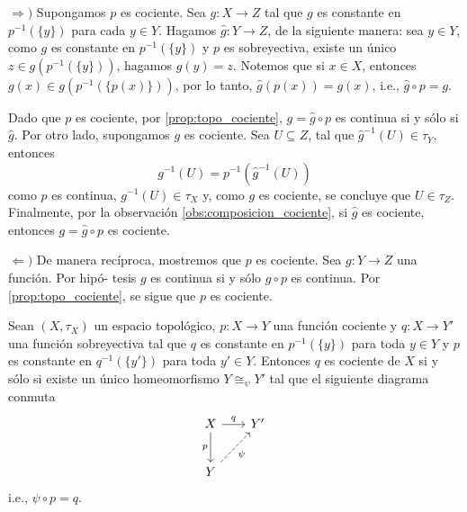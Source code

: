 \begin{dem}
    $\Rightarrow)$ Supongamos $p$ es cociente. Sea $g:X\to Z$ tal que $g$ es constante en $p^{-1}(\{y\})$ para cada $y\in Y$. Hagamos $\hat{g}:Y\to Z$, de la siguiente manera: sea $y\in Y$, como $g$ es constante en $p^{-1}(\{y\})$ y $p$ es sobreyectiva, existe un único $z\in g(p^{-1}(\{y\}))$, hagamos $\hat{g}(y)=z$. Notemos que si $x\in X$, entonces $g(x)\in g(p^{-1}(\{p(x)\}))$, por lo tanto, $\hat{g}(p(x))=g(x)$, i.e., $\hat{g}\circ p=g$. 

    Dado que $p$ es cociente, por \ref{prop:topo_cociente}, $g=\hat{g}\circ p$ es continua si y sólo si $\hat{g}$. Por otro lado, supongamos $g$ es cociente. Sea $U\subseteq Z$, tal que $\hat{g}^{-1}(U)\in\tau_Y$, entonces
    \begin{equation*}
       g^{-1}(U)=p^{-1}(\hat{g}^{-1}(U))
    \end{equation*}
    como $p$ es continua, $g^{-1}(U)\in\tau_X$ y, como $g$ es cociente, se concluye que $U\in\tau_Z$. Finalmente, por la observación \ref{obs:composicion_cociente}, si $\hat{g}$ es cociente, entonces $g=\hat{g}\circ p$ es cociente.

    $\Leftarrow)$ De manera recíproca, mostremos que $p$ es cociente. Sea $g:Y\to Z$ una función. Por hipó- tesis $g$ es continua si y sólo $g\circ p$ es continua. Por \ref{prop:topo_cociente}, se sigue que $p$ es cociente.
\end{dem}
\begin{prop}
\label{prop:homomorphis between quotient}
    Sean $(X,\tau_X)$ un espacio topológico, $p:X\to Y$ una función cociente y $q:X\to Y'$ una función sobreyectiva tal que $q$ es constante en $p^{-1}(\{y\})$ para toda $y\in Y$ y $p$ es constante en  $q^{-1}(\{y'\})$ para toda $y'\in Y$. Entonces $q$ es cociente de $X$ si y sólo si existe un único homeomorfismo $Y\cong_\psi Y'$ tal que el siguiente diagrama conmuta
    \[
    \begin{tikzcd}[column sep=0.65cm, row sep=0.85cm] 
        X\arrow[r,"q"] \arrow[d,"p"'] & Y'\\
        Y \arrow[ur, dashed, "\psi"']
    \end{tikzcd}
    \]
    i.e., $\psi\circ p=q$.
\end{prop}
